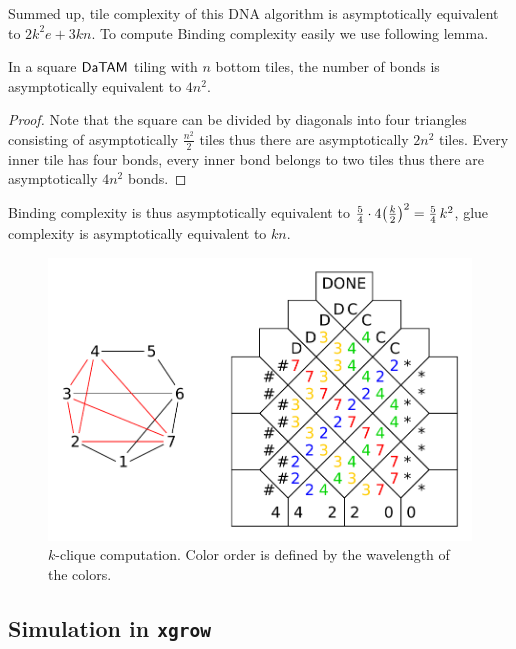 Summed up, tile complexity of this DNA algorithm is asymptotically equivalent to $2 k^2 e + 3 kn$. To compute Binding complexity easily we use following lemma.

\begin{lemma}
	In a square $\mathsf{DaTAM}$ tiling with $n$ bottom tiles, the number of bonds is asymptotically equivalent to $4 n^2$.
\end{lemma}
\begin{proof}
	Note that the square can be divided by diagonals into four triangles consisting of asymptotically $\frac{n^2}{2}$ tiles thus there are asymptotically $2n^2$ tiles. Every inner tile has four bonds, every inner bond belongs to two tiles thus there are asymptotically $4n^2$ bonds.
\end{proof}

Binding complexity is thus asymptotically equivalent to $\nicefrac{5}{4} \cdot 4 \bigl(\frac{k}{2}\bigr)^2 = \nicefrac{5}{4}\,k^2$, glue complexity is asymptotically equivalent to $kn$.

\begin{figure}[H]
\begin{center}
	\includegraphics[scale=0.75]{./figures/k-clique/k-clique.pdf}
	\caption{$k$-clique computation. Color order is defined by the wavelength of the colors.}
	\label{fig:k-clique}
\end{center}
\end{figure}

\subsection{Simulation in {\tt xgrow}}
\label{sec:xgrow}

